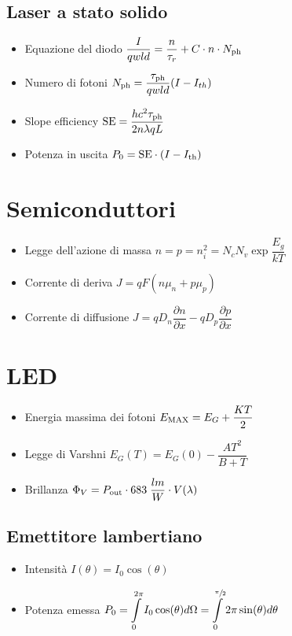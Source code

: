 \documentclass{article}
\begin{document}
\subsection{Laser a stato solido}
\begin{itemize}
  \item Equazione del diodo \( \dfrac{I}{q w l d} = \dfrac{n}{\tau_r} + C \cdot n \cdot N_{\textnormal{ph}}\)
  \item Numero di fotoni \( N_{\textnormal{ph}} = \dfrac{\tau_{\textnormal{ph}}}{q w l d} ( I - I_{th}) \)
  \item Slope efficiency \( \textnormal{SE} = \dfrac{h c^2 \tau_{\textnormal{ph}}}{2 n  \lambda q L} \)
  \item Potenza in uscita \( P_0 = \textnormal{SE} \cdot (I - I_{\textnormal{th}} ) \)
\end{itemize}

\newpage

\section{Semiconduttori}
\begin{itemize}
  \item Legge dell'azione di massa \( n = p = n_i ^ 2 = N_c N_v \exp{\dfrac{E_g}{k T}} \)
  \item Corrente di deriva \( J = q F (n \mu_n + p \mu_p) \)
  \item Corrente di diffusione \( J = q D_n \dfrac{\partial n}{\partial x} - q D_p \dfrac{\partial p}{\partial x} \)
\end{itemize}

\section{LED}
\begin{itemize}
  \item Energia massima dei fotoni \( E_{\textnormal{MAX}} = E_G + \dfrac{KT}{2} \)
  \item Legge di Varshni \( E_G (T) = E_G (0) - \dfrac{A T ^2}{B+T} \)
  \item Brillanza \( \Phi_V = P_{\textnormal{out}} \cdot 683 \; \dfrac{lm}{W} \cdot V (\lambda) \)
\end{itemize}

\subsection{Emettitore lambertiano}
\begin{itemize}
  \item Intensità \( I (\theta) = I_0 \cos(\theta) \)
  \item Potenza emessa \( \displaystyle P_0 = \int\limits_{0}^{2 \pi} I_0 \cos(\theta) d\Omega = \int\limits_{0}^{\sfrac{\pi}{2}} 2 \pi \sin(\theta) d\theta \)
\end{itemize}
\end{document}
